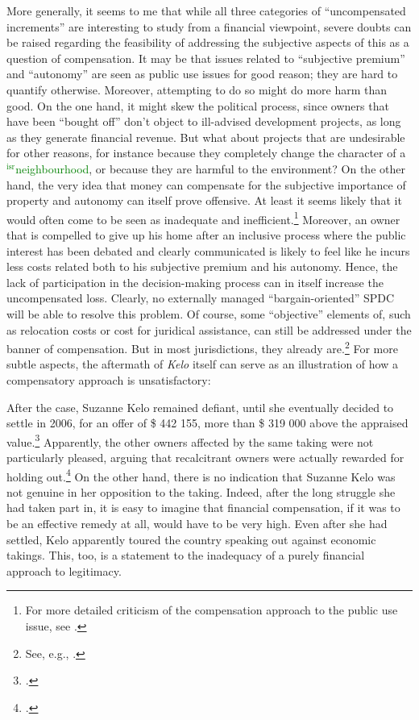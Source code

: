 \documentclass[12pt,a4paper]{book} %
\newcommand{\isr}[1]{\textcolor{green}{$^{\textrm{isr}}${#1}}}
\begin{document}
More generally, it seems to me that while all three categories of ``uncompensated increments'' are interesting to study from a financial viewpoint, severe doubts can be raised regarding the feasibility of addressing the subjective aspects of this as a question of compensation. It may be that issues related to ``subjective premium'' and ``autonomy'' are seen as public use issues for good reason; they are hard to quantify otherwise. Moreover, attempting to do so might do more harm than good. On the one hand, it might skew the political process, since owners that have been ``bought off'' don't object to ill-advised development projects, as long as they generate financial revenue. But what about projects that are undesirable for other reasons, for instance because they completely change the character of a \isr{neighbourhood}, or because they are harmful to the environment? On the other hand, the very idea that money can compensate for the subjective importance of property and autonomy can itself prove offensive. At least it seems likely that it would often come to be seen as inadequate and inefficient.\footnote{For more detailed criticism of the compensation approach to the public use issue, see \cite{garnett06}.} Moreover, an owner that is compelled to give up his home after an inclusive process where the public interest has been debated and clearly communicated is likely to feel like he incurs less costs related both to his subjective premium and his autonomy. Hence, the lack of participation in the decision-making process can in itself increase the uncompensated loss. Clearly, no externally managed ``bargain-oriented'' SPDC will be able to resolve this problem. Of course, some ``objective'' elements of, such as relocation costs or cost for juridical assistance, can still be addressed under the banner of compensation. But in most jurisdictions, they already are.\footnote{See, e.g., \cite[121-126]{garnett06}.} For more subtle aspects, the aftermath of {\it Kelo} itself can serve as an illustration of how a compensatory approach is unsatisfactory:

After the case, Suzanne Kelo remained defiant, until she eventually decided to settle in 2006, for an offer of \$ 442 155, more than \$ 319 000 above the appraised value.\footcite[1709]{lehavi07} Apparently, the other owners affected by the same taking were not particularly pleased, arguing that recalcitrant owners were actually rewarded for holding out.\footcite[1709]{lehavi07} On the other hand, there is no indication that Suzanne Kelo was not genuine in her opposition to the taking. Indeed, after the long struggle she had taken part in, it is easy to imagine that financial compensation, if it was to be an effective remedy at all, would have to be very high. Even after she had settled, Kelo apparently toured the country speaking out against economic takings. This, too, is a statement to the inadequacy of a purely financial approach to legitimacy. 
\end{document}
